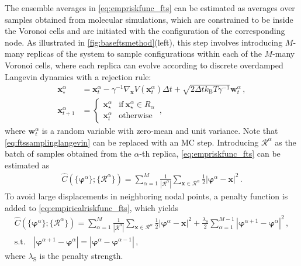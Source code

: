 \documentclass{article}
\numberwithin{equation}{section}
\def\*#1{\mathbf{#1}}
\theoremstyle{definition}
\theoremstyle{remark}
\def\varphib{\boldsymbol{\varphi}}
\begin{document}
The ensemble averages in \cref{eq:empriskfunc_fts} can be estimated as averages over samples obtained from molecular simulations, which are constrained to be inside the Voronoi cells and are initiated with the configuration of the corresponding node. 
As illustrated in \cref{fig:baseftsmethod}(left), this step involves introducing $M$-many replicas of the system to sample configurations within each of the $M$-many Voronoi cells, where
each replica can evolve according to discrete overdamped Langevin dynamics with a rejection rule: 
\begin{align}
\* x^{\alpha}_{\star} &=    \*x^{\alpha}_{t}-\gamma^{-1}\nabla_{\* x} V(\* x^{\alpha}_{t}) \Delta t + \sqrt{2 \Delta t k_\mathrm{B} T\gamma^{-1}} \* w^{\alpha}_{t} \,, \label{eq:ftssamplinglangevin}
\\
\* x_{t+1}^\alpha &= \begin{cases}
    \*x^{\alpha}_{\star} & \text{if} \ \* x^{\alpha}_{\star} \in R_\alpha 
    \\
    \* x^{\alpha}_{t} & \text{otherwise} 
    \end{cases}
    \label{eq:ftsrejection} \,,
\end{align}
where $\* w_t^\alpha $ is a random variable with zero-mean and unit variance. Note that \cref{eq:ftssamplinglangevin} can be replaced with an MC step.
Introducing $\mathcal{R}^\alpha$ as the batch of samples obtained from the $\alpha$-th replica, \cref{eq:empriskfunc_fts} can be estimated as 
\begin{gather}
\hat{C}(\{\varphib^\alpha\}; \{\mathcal{R}^\alpha\}) =  \sum_{\alpha=1}^M \frac{1}{|\mathcal{R}^\alpha|} \sum_{\* x \in \mathcal{R}^\alpha}  \frac{1}{2} |\varphib^\alpha-\* x|^2 \,. 
\label{eq:empiricalriskfunc_fts} 
\end{gather}
To avoid large displacements in neighboring nodal points, a penalty function is added to \cref{eq:empiricalriskfunc_fts}, which yields 
\begin{gather}
\hat{C}(\{\varphib^\alpha\}; \{\mathcal{R}^\alpha\}) =  \sum_{\alpha=1}^M \frac{1}{|\mathcal{R}^\alpha|} \sum_{\* x \in \mathcal{R}^\alpha}  \frac{1}{2} |\varphib^\alpha-\* x|^2  + \frac{\lambda_\mathrm{S}}{2} \sum_{\alpha=1}^{M-1} |\varphib^{\alpha+1}-\varphib^{\alpha}|^2  \label{eq:empiricalriskfunc_fts_soft}  \,,
\\
\text{s.t.} \quad |\varphib^{\alpha+1}-\varphib^{\alpha}|=|\varphib^{\alpha}-\varphib^{\alpha-1}| \,, \label{eq:ftsconstraint}
\end{gather}
where $\lambda_\mathrm{S}$ is the penalty strength. 
\end{document}
